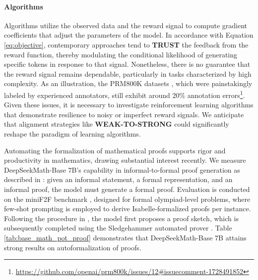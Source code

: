 \begin{itemize}[topsep=0pt]
\paragraph{Algorithms} Algorithms utilize the observed data and the reward signal to compute gradient coefficients that adjust the parameters of the model. In accordance with Equation \ref{eq:objective}, contemporary approaches tend to \textbf{TRUST} the feedback from the reward function, thereby modulating the conditional likelihood of generating specific tokens in response to that signal. Nonetheless, there is no guarantee that the reward signal remains dependable, particularly in tasks characterized by high complexity. As an illustration, the PRM800K datasets \citep{lightman2023let}, which were painstakingly labeled by experienced annotators, still exhibit around 20\% annotation errors\footnote{\url{https://github.com/openai/prm800k/issues/12\#issuecomment-1728491852}}. Given these issues, it is necessary to investigate reinforcement learning algorithms that demonstrate resilience to noisy or imperfect reward signals. We anticipate that alignment strategies like \textbf{WEAK-TO-STRONG} \citep{burns2023weak} could significantly reshape the paradigm of learning algorithms.

Automating the formalization of mathematical proofs supports rigor and productivity in mathematics, drawing substantial interest recently. We measure DeepSeekMath-Base 7B’s capability in informal-to-formal proof generation as described in \citep{dsp_proof}: given an informal statement, a formal representation, and an informal proof, the model must generate a formal proof. Evaluation is conducted on the miniF2F benchmark \citep{minif2f}, designed for formal olympiad-level problems, where few-shot prompting is employed to derive Isabelle-formalized proofs per instance. Following the procedure in \cite{dsp_proof}, the model first proposes a proof sketch, which is subsequently completed using the Sledgehammer automated prover \citep{sledgehammer}. Table \ref{tab:base_math_pot_proof} demonstrates that DeepSeekMath-Base 7B attains strong results on autoformalization of proofs.


\end{itemize}
